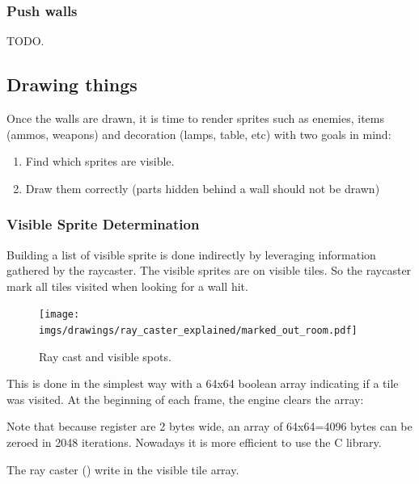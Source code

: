 \subsubsection{Push walls} 
TODO.\\


















\subsection{Drawing things}
Once the walls are drawn, it is time to render sprites such as enemies, items (ammos, weapons) and decoration (lamps, table, etc) with two goals in mind:
 \begin{enumerate}
  \item Find which sprites are visible.
  \item Draw them correctly (parts hidden behind a wall should not be drawn)
 \end{enumerate}



\subsubsection{Visible Sprite Determination}
Building a list of visible sprite is done indirectly by leveraging information gathered by the raycaster. The visible sprites are on visible tiles. So the raycaster mark all tiles visited when looking for a wall hit.\\
\begin{figure}[H]
  \centering
  \texttt{[image: imgs/drawings/ray\_caster\_explained/marked\_out\_room.pdf]}
 \caption{Ray cast and visible spots.} 
\end{figure}
This is done in the simplest way with a 64x64 boolean array indicating if a tile was visited. At the beginning of each frame, the engine clears the array:
 
 \par
 Note that because register are 2 bytes wide, an array of 64x64=4096 bytes can be zeroed in 2048 iterations. Nowadays it is more efficient to use the C library.
 
 \par
The ray caster () write  in the visible tile array.

